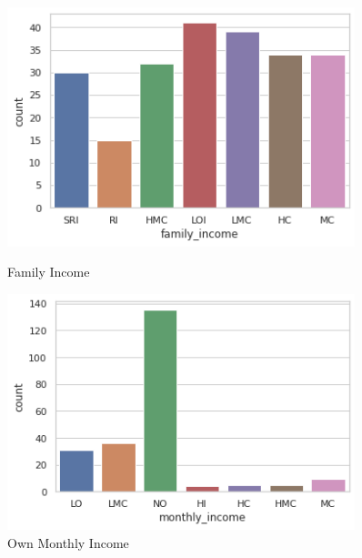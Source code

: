 \documentclass[12pt, english]{article}
\begin{document}
\begin{figure}[H]
    \centering
    \begin{minipage}{0.45\textwidth}
        \centering
        \includegraphics[width=0.9\textwidth]{images/family_income.png} %
        \caption{Family Income}
    \end{minipage}\hfill
    \begin{minipage}{0.45\textwidth}
        \centering
        \includegraphics[width=0.9\textwidth]{images/monthly_income.png} %
        \caption{Own Monthly Income}
    \end{minipage}
\end{figure}
\end{document}
